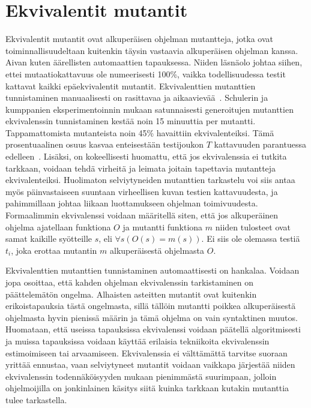 \documentclass{tktltiki}
\begin{document}
\section{Ekvivalentit mutantit}
Ekvivalentit mutantit ovat alkuperäisen ohjelman mutantteja, jotka ovat toiminnallisuudeltaan kuitenkin täysin vastaavia alkuperäisen ohjelman kanssa. Aivan kuten äärellisten automaattien tapauksessa. Niiden läsnäolo johtaa siihen, ettei mutaatiokattavuus ole numeerisesti 100\%, vaikka todellisuudessa testit kattavat kaikki epäekvivalentit mutantit. Ekvivalenttien mutanttien tunnistaminen manuaalisesti on rasittavaa ja aikaavievää~\cite{GrunSZ09}. Schulerin ja kumppanien eksperimentoinnin mukaan satunnaisesti generoitujen mutanttien ekvivalenssin tunnistaminen kestää noin 15 minuuttia per mutantti. Tappamattomista mutanteista noin 45\% havaittiin ekvivalenteiksi. Tämä prosentuaalinen osuus kasvaa enteisestään testijoukon $T$ kattavuuden parantuessa edelleen~\cite{SchulerZ10}. Lisäksi, on kokeellisesti huomattu, että jos ekvivalenssia ei tutkita tarkkaan, voidaan tehdä virheitä ja leimata joitain tapettavia mutantteja ekvivalenteiksi. Huolimaton selviytyneiden mutanttien tarkastelu voi siis antaa myös päinvastaiseen suuntaan virheellisen kuvan testien kattavuudesta, ja pahimmillaan johtaa liikaan luottamukseen ohjelman toimivuudesta. Formaalimmin ekvivalenssi voidaan määritellä siten, että jos alkuperäinen ohjelma ajatellaan funktiona $O$ ja mutantti funktiona $m$ niiden tulosteet ovat samat kaikille syötteille $s$, eli $\forall s(O(s) = m(s))$. Ei siis ole olemassa testiä $t_i$, joka erottaa mutantin $m$ alkuperäisestä ohjelmasta $O$. 

Ekvivalenttien mutanttien tunnistaminen automaattisesti on hankalaa. Voidaan jopa osoittaa, että kahden ohjelman ekvivalenssin tarkistaminen on päättelemätön ongelma. Alhaisten asteitten mutantit ovat kuitenkin erikoistapauksia tästä ongelmasta, sillä tällöin mutantti poikkea alkuperäisestä ohjelmasta hyvin pienissä määrin ja tämä ohjelma on vain syntaktinen muutos. Huomataan, että useissa tapauksissa ekvivalenssi voidaan päätellä algoritmisesti ja muissa tapauksissa voidaan käyttää erilaisia tekniikoita ekvivalenssin estimoimiseen tai arvaamiseen. Ekvivalenssia ei välttämättä tarvitse suoraan yrittää ennustaa, vaan selviytyneet mutantit voidaan vaikkapa järjestää niiden ekvivalenssin todennäköisyyden mukaan pienimmästä suurimpaan, jolloin ohjelmoijilla on jonkinlainen käsitys siitä kuinka tarkkaan kutakin mutanttia tulee tarkastella.
\end{document}
